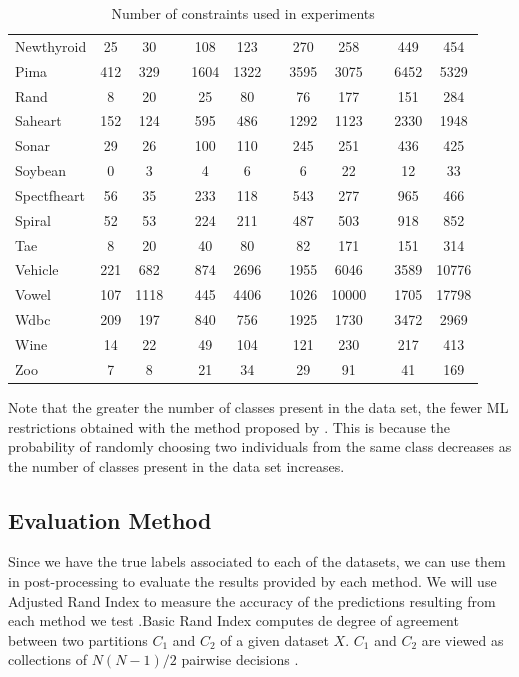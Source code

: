 \documentclass[review]{elsarticle}
\begin{document}
\begin{table}[!h]
{\begin{tabular}{lcc c cc c cc c cc}
		Newthyroid & 25 & 30 && 108 & 123 && 270 & 258 && 449 & 454 \\
		Pima & 412 & 329 && 1604 & 1322 && 3595 & 3075 && 6452 & 5329 \\
		Rand & 8 & 20 && 25 & 80 && 76 & 177 && 151 & 284 \\
		Saheart & 152 & 124 && 595 & 486 && 1292 & 1123 && 2330 & 1948 \\
		Sonar & 29 & 26 && 100 & 110 && 245 & 251 && 436 & 425 \\
		Soybean & 0 & 3 && 4 & 6 && 6 & 22 && 12 & 33 \\
		Spectfheart & 56 & 35 && 233 & 118 && 543 & 277 && 965 & 466 \\
		Spiral & 52 & 53 && 224 & 211 && 487 & 503 && 918 & 852 \\
		Tae & 8 & 20 && 40 & 80 && 82 & 171 && 151 & 314 \\
		Vehicle & 221 & 682 && 874 & 2696 && 1955 & 6046 && 3589 & 10776 \\
		Vowel & 107 & 1118 && 445 & 4406 && 1026 & 10000 && 1705 & 17798 \\
		Wdbc & 209 & 197 && 840 & 756 && 1925 & 1730 && 3472 & 2969 \\
		Wine & 14 & 22 && 49 & 104 && 121 & 230 && 217 & 413 \\
		Zoo & 7 & 8 && 21 & 34 && 29 & 91 && 41 & 169 \\
		\hline

	\end{tabular}}

	\caption{Number of constraints used in experiments}
	\label{tab:constraints}
\end{table}

Note that the greater the number of classes present in the data set, the fewer ML restrictions obtained with the method proposed by \cite{wagstaff2001constrained}. This is because the probability of randomly choosing two individuals from the same class decreases as the number of classes present in the data set increases.

\clearpage

\subsection{Evaluation Method}

Since we have the true labels associated to each of the datasets, we can use them in post-processing to evaluate the results provided by each method. We will use Adjusted Rand Index to measure the accuracy of the predictions resulting from each method we test \cite{hubert1985comparing}.Basic Rand Index computes de degree of agreement between two partitions $C_1$ and $C_2$ of a given dataset $X$. $C_1$ and $C_2$ are viewed as collections of $N(N - 1)/2$ pairwise decisions \cite{rand1971objective}.
\end{document}
